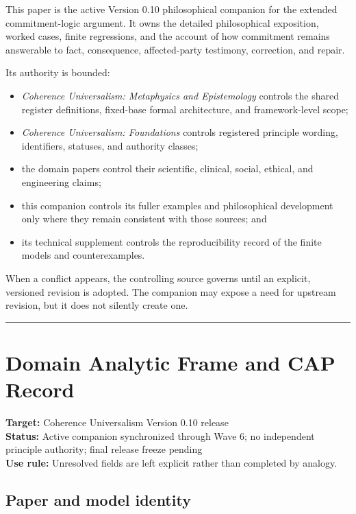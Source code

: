 \documentclass[
  11pt,
]{article}
\providecommand{\tightlist}{%
  \setlength{\itemsep}{0pt}\setlength{\parskip}{0pt}}
\begin{document}
This paper is the active Version 0.10 philosophical companion for the
extended commitment-logic argument. It owns the detailed philosophical
exposition, worked cases, finite regressions, and the account of how
commitment remains answerable to fact, consequence, affected-party
testimony, correction, and repair.

Its authority is bounded:

\begin{itemize}
\tightlist
\item
  \emph{Coherence Universalism: Metaphysics and Epistemology} controls
  the shared register definitions, fixed-base formal architecture, and
  framework-level scope;
\item
  \emph{Coherence Universalism: Foundations} controls registered
  principle wording, identifiers, statuses, and authority classes;
\item
  the domain papers control their scientific, clinical, social, ethical,
  and engineering claims;
\item
  this companion controls its fuller examples and philosophical
  development only where they remain consistent with those sources; and
\item
  its technical supplement controls the reproducibility record of the
  finite models and counterexamples.
\end{itemize}

When a conflict appears, the controlling source governs until an
explicit, versioned revision is adopted. The companion may expose a need
for upstream revision, but it does not silently create one.

\begin{center}\rule{0.5\linewidth}{0.5pt}\end{center}

\section{Domain Analytic Frame and CAP
Record}\label{domain-analytic-frame-and-cap-record}

\textbf{Target:} Coherence Universalism Version 0.10 release\\
\textbf{Status:} Active companion synchronized through Wave 6; no
independent principle authority; final release freeze pending\\
\textbf{Use rule:} Unresolved fields are left explicit rather than
completed by analogy.

\subsection{Paper and model identity}\label{paper-and-model-identity}
\end{document}
